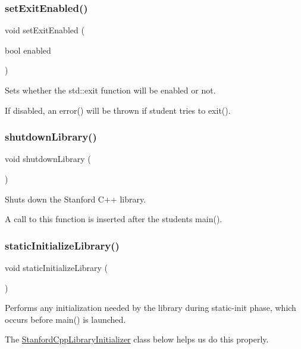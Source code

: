 \subsubsection{\texorpdfstring{set\+Exit\+Enabled()}{setExitEnabled()}}
{\footnotesize\ttfamily void set\+Exit\+Enabled (\begin{DoxyParamCaption}\item[{bool}]{enabled }\end{DoxyParamCaption})}



Sets whether the std\+::exit function will be enabled or not. 

If disabled, an error() will be thrown if student tries to exit(). \mbox{\label{namespacestanfordcpplib_a2937cb1c4385064875d0cb29fcdfeae6}} 
\subsubsection{\texorpdfstring{shutdown\+Library()}{shutdownLibrary()}}
{\footnotesize\ttfamily void shutdown\+Library (\begin{DoxyParamCaption}{ }\end{DoxyParamCaption})}



Shuts down the Stanford C++ library. 

A call to this function is inserted after the student\textquotesingle{}s main(). \mbox{\label{namespacestanfordcpplib_ad5dc96d7e324f70b6bd681ad41abcaa7}} 
\subsubsection{\texorpdfstring{static\+Initialize\+Library()}{staticInitializeLibrary()}}
{\footnotesize\ttfamily void static\+Initialize\+Library (\begin{DoxyParamCaption}{ }\end{DoxyParamCaption})}



Performs any initialization needed by the library during static-\/init phase, which occurs before main() is launched. 

The \mbox{\hyperlink{classstanfordcpplib_1_1StanfordCppLibraryInitializer}{Stanford\+Cpp\+Library\+Initializer}} class below helps us do this properly. 